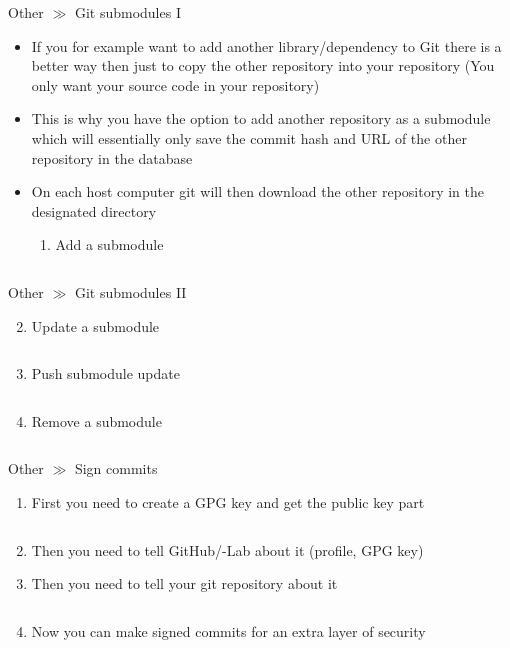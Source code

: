 \documentclass[10pt]{beamer}
\begin{document}
\begin{frame}{Other $\gg$ Git submodules I}
	\begin{itemize}
		\item If you for example want to add another library/dependency to Git there is a better way then just to copy the other repository into your repository (You only want your source code in your repository)
		\item This is why you have the option to add another repository as a submodule which will essentially only save the commit hash and URL of the other repository in the database
		\item On each host computer git will then download the other repository in the designated directory
		\begin{enumerate}
			\item Add a submodule
			\inputminted[bgcolor=lightGreyCustom,fontsize=\scriptsize]{sh}{./resources/git_submodule_01_add.sh}
		\end{enumerate}
	\end{itemize}
\end{frame}

\begin{frame}{Other $\gg$ Git submodules II}
	\begin{enumerate}\setcounter{enumi}{1}
		\item Update a submodule
		\inputminted[bgcolor=lightGreyCustom,fontsize=\scriptsize]{sh}{./resources/git_submodule_02_update.sh}
		\item Push submodule update
		\inputminted[bgcolor=lightGreyCustom,fontsize=\scriptsize]{sh}{./resources/git_submodule_03_push_update.sh}
		\item Remove a submodule
		\inputminted[bgcolor=lightGreyCustom,fontsize=\scriptsize]{sh}{./resources/git_submodule_04_remove.sh}
	\end{enumerate}
\end{frame}

\begin{frame}{Other $\gg$ Sign commits}
	\begin{enumerate}
		\item First you need to create a GPG key and get the public key part
		\inputminted[bgcolor=lightGreyCustom,fontsize=\scriptsize]{sh}{./resources/git_sign_commits_01_gpg_key.sh}
		\item Then you need to tell GitHub/-Lab about it (profile, GPG key)
		\item Then you need to tell your git repository about it
		\inputminted[bgcolor=lightGreyCustom,fontsize=\scriptsize]{sh}{./resources/git_sign_commits_02_register_key.sh}
		\item Now you can make signed commits for an extra layer of security
		\inputminted[bgcolor=lightGreyCustom,fontsize=\scriptsize]{sh}{./resources/git_sign_commits_03_signed_commit.sh}
	\end{enumerate}
\end{frame}
\end{document}
